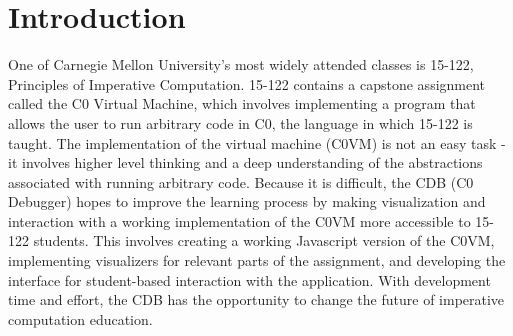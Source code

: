 \documentclass[11pt]{article}
\begin{document}
\section{Introduction}
One of Carnegie Mellon University's most widely attended classes is 15-122,
Principles of Imperative Computation. 15-122 contains a capstone assignment
called the C0 Virtual Machine, which involves implementing a program that
allows the user to run arbitrary code in C0, the language in which 15-122 is
taught. The implementation of the virtual machine (C0VM) is not an easy
task - it involves higher level thinking and a deep understanding of the
abstractions associated with running arbitrary code. Because it is difficult,
the CDB (C0 Debugger) hopes to improve the learning process by making
visualization and interaction with a working implementation of the C0VM more
accessible to 15-122 students. This involves creating a working Javascript
version of the C0VM, implementing visualizers for relevant parts of the
assignment, and developing the interface for student-based interaction with
the application. With development time and effort, the CDB has the opportunity
to change the future of imperative computation education.
\end{document}
